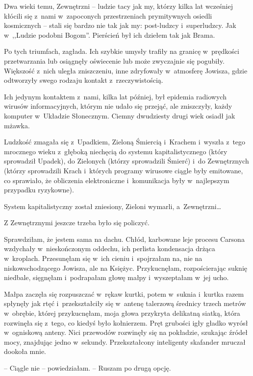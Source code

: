 \documentclass[oneside,polish,11pt,sfheadings]{mwbk}
\begin{document}
Dwa wieki temu, Zewnętrzni -- ludzie tacy jak my, którzy kilka lat
wcześniej kłócili się z~nami w~zapoconych przestrzeniach prymitywnych
osiedli kosmicznych -- stali się bardzo nie tak jak my: post-ludzcy i~superludzcy. Jak w~,,Ludzie podobni Bogom''. Pierścień był ich dziełem
tak jak Brama.

Po tych triumfach, zagłada. Ich szybkie umysły trafiły na granicę w~prędkości przetwarzania lub osiągnęły oświecenie lub może zwyczajnie się
pogubiły. Większość z~nich uległa zniszczeniu, inne zdryfowały w~atmosferę Jowisza, gdzie odtworzyły swego rodzaju kontakt z~rzeczywistością.

Ich jedynym kontaktem z~nami, kilka lat później, był epidemia radiowych
wirusów informacyjnych, którym nie udało się przejąć, ale zniszczyły,
każdy komputer w~Układzie Słonecznym. Ciemny dwudziesty drugi wiek
osiadł jak mżawka.

Ludzkość zmagała się z~Upadkiem, Zieloną Śmiercią i~Krachem i~wyszła z~tego mrocznego wieku z~głęboką niechęcią do systemu kapitalistycznego
(który sprowadził Upadek), do Zielonych (którzy sprowadzili Śmierć) i~do
Zewnętrznych (którzy sprowadzili Krach i~których programy wirusowe
ciągle były emitowane, co sprawiało, że obliczenia elektroniczne i~komunikacja były w~najlepszym przypadku ryzykowne).

System kapitalistyczny został zniesiony, Zieloni wymarli, a~Zewnętrzni\ldots 

Z Zewnętrznymi jeszcze trzeba było się policzyć.

Sprawdziłam, że jestem sama na dachu. Chłód, karbowane leje procesu
Carsona wzdychały w~nieskończonym oddechu, ich perlista kondensacja
drżąca w~kroplach. Przesunęłam się w~ich cieniu i~spojrzałam na, nie na
niskowschodzącego Jowisza, ale na Księżyc. Przykucnęłam, rozpościerając
suknię niedbale, sięgnęłam i~podrapałam głowę małpy i~wyszeptałam w~jej
ucho.

Małpa zaczęła się rozpuszczać w~rękaw kurtki, potem w~suknia i~kurtka
razem spłynęły jak rtęć i~przekształciły się w~antenę talerzową średnicy
trzech metrów w~obrębie, której przykucnęłam, moja głowa przykryta
delikatną siatką, która rozwinęła się z~tego, co kiedyś było kołnierzem.
Pręt grubości igły gładko wyrósł w~ogniskową anteny. Nici przewodów
rozwinęły się na pokładzie, szukając źródeł mocy, znajdując jedno w~sekundy. Przekształcony inteligenty skafander mruczał dookoła mnie.

-- Ciągle nie -- powiedziałam. -- Ruszam po drugą opcję.
\end{document}
